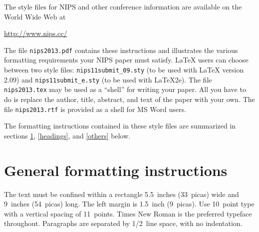 \documentclass{article} %
\begin{document}
The style files for NIPS and other conference information are available on the World Wide Web at
\begin{center}
   \url{http://www.nips.cc/}
\end{center}
The file \verb+nips2013.pdf+ contains these
instructions and illustrates the
various formatting requirements your NIPS paper must satisfy. \LaTeX{}
users can choose between two style files:
\verb+nips11submit_09.sty+ (to be used with \LaTeX{} version 2.09) and
\verb+nips11submit_e.sty+ (to be used with \LaTeX{}2e). The file
\verb+nips2013.tex+ may be used as a ``shell'' for writing your paper. All you
have to do is replace the author, title, abstract, and text of the paper with
your own. The file
\verb+nips2013.rtf+ is provided as a shell for MS Word users.

The formatting instructions contained in these style files are summarized in
sections \ref{gen_inst}, \ref{headings}, and \ref{others} below.




\section{General formatting instructions}
\label{gen_inst}

The text must be confined within a rectangle 5.5~inches (33~picas) wide and
9~inches (54~picas) long. The left margin is 1.5~inch (9~picas).
Use 10~point type with a vertical spacing of 11~points. Times New Roman is the
preferred typeface throughout. Paragraphs are separated by 1/2~line space,
with no indentation.
\end{document}
